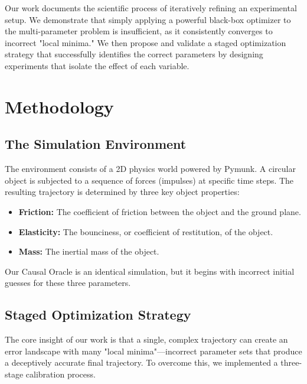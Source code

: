 \documentclass{article}
\begin{document}
Our work documents the scientific process of iteratively refining an experimental setup. We demonstrate that simply applying a powerful black-box optimizer \cite{snoek2012} to the multi-parameter problem is insufficient, as it consistently converges to incorrect "local minima." We then propose and validate a staged optimization strategy that successfully identifies the correct parameters by designing experiments that isolate the effect of each variable.

\section{Methodology}

\subsection{The Simulation Environment}
The environment consists of a 2D physics world powered by Pymunk. A circular object is subjected to a sequence of forces (impulses) at specific time steps. The resulting trajectory is determined by three key object properties:
\begin{itemize}
\item \textbf{Friction:} The coefficient of friction between the object and the ground plane.
\item \textbf{Elasticity:} The bounciness, or coefficient of restitution, of the object.
\item \textbf{Mass:} The inertial mass of the object.
\end{itemize}
Our Causal Oracle is an identical simulation, but it begins with incorrect initial guesses for these three parameters.

\subsection{Staged Optimization Strategy}
The core insight of our work is that a single, complex trajectory can create an error landscape with many "local minima"—incorrect parameter sets that produce a deceptively accurate final trajectory. To overcome this, we implemented a three-stage calibration process.
\end{document}
